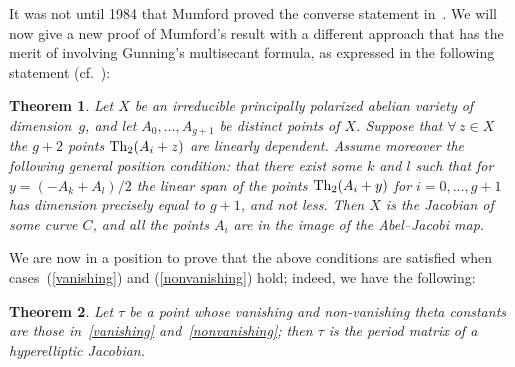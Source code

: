 \documentclass[pdftex]{sigma}
\numberwithin{equation}{section}
\newtheorem{Theorem}{Theorem}[section]
\begin{document}
 It was not until 1984 that Mumford proved the converse statement in~\cite{mu}. We will now give a new proof of Mumford's result with a different approach that has the merit of involving Gunning's multisecant formula, as expressed in the following statement (cf.~\cite{Gu}):
 \begin{Theorem} Let $X$ be an irreducible principally polarized abelian variety of dimension~$g$, and let $A_0, \dots , A_{g+1}$ be distinct points of $X$. Suppose that $\forall\, z\in X$ the $g + 2 $ points ${\rm Th}_2(A_i + z) $ are linearly dependent.
Assume moreover the following general position condition: that there
exist some $k$ and $l$ such that for $y=(-A_k+A_l)/2$ the linear span of the points ${\rm Th}_2(A_i + y) $ for $ i = 0 , \dots , g+1$ has dimension precisely equal to $g+1$, and
not less. Then $X$ is the Jacobian of some curve $C$, and all the points $A_i$ are in the image of the Abel--Jacobi map.
\end{Theorem}

We are now in a position to prove that the above conditions are satisfied when cases~(\ref{vanishing}) and (\ref{nonvanishing}) hold; indeed, we have the following:

\begin{Theorem} Let $\tau$ be a point whose vanishing and non-vanishing theta constants are those in~\eqref{vanishing} and~\eqref{nonvanishing}; then $\tau$ is the period
matrix of a hyperelliptic Jacobian.
\end{Theorem}
\end{document}
